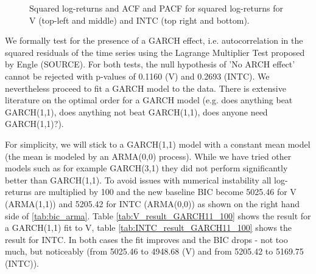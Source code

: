 \begin{figure}[h!]
    \centering
    \begin{adjustbox}{width=.95\textwidth,center}
    
    
    \end{adjustbox}
    \hspace{3ex}
    \begin{adjustbox}{width=.95\textwidth,center}
    
    \end{adjustbox}
    \begin{adjustbox}{width=.95\textwidth,center}
    
    \end{adjustbox}
    \caption{Squared log-returns and ACF and PACF for squared log-returns for V (top-left and middle) and INTC (top right and bottom). }
    \label{fig:V_INTC_squared}
\end{figure}{}

We formally test for the presence of a GARCH effect, i.e. autocorrelation in the squared residuals of the time series using the Lagrange Multiplier Test proposed by Engle (SOURCE). For both tests, the null hypothesis of 'No ARCH effect' cannot be rejected with p-values of 0.1160 (V) and 0.2693 (INTC). We nevertheless proceed to fit a GARCH model to the data. There is extensive literature on the optimal order for a GARCH model (e.g. does anything beat GARCH(1,1), does anything not beat GARCH(1,1), does anyone need GARCH(1,1)?). 

For simplicity, we will stick to a GARCH(1,1) model with a constant mean model (the mean is modeled by an ARMA(0,0) process). While we have tried other models such as for example GARCH(3,1) they did not perform significantly better than GARCH(1,1). To avoid issues with numerical instability all log-returns are multiplied by 100 and the new baseline BIC become 5025.46 for V (ARMA(1,1)) and 5205.42 for INTC (ARMA(0,0)) as shown on the right hand side of \ref{tab:bic_arma}. Table \ref{tab:V_result_GARCH11_100} shows the result for a GARCH(1,1) fit to V, table \ref{tab:INTC_result_GARCH11_100} shows the result for INTC. In both cases the fit improves and the BIC drops - not too much, but noticeably (from 5025.46 to 4948.68 (V) and from 5205.42 to 5169.75 (INTC)). 

\begin{table}[h!]
    \centering
    \vspace{-2ex}
    \small
    
    \caption{}
    \label{tab:V_result_GARCH11_100}
\end{table}{}

